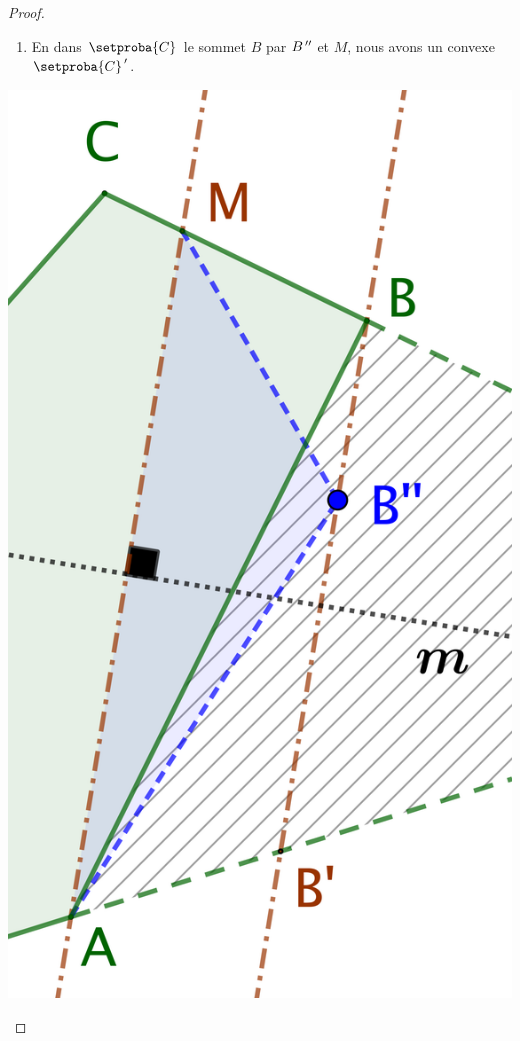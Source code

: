 \begin{proof}
\begin{itemize}
\begin{enumerate}
			\item En  dans $\setproba{C}$ le sommet $B$ par $B^{\,\prime\prime}$ et $M$,
		nous avons un  convexe $\primeit{\setproba{C}}$.
		\end{enumerate}
		\begin{center}
			\includegraphics[scale=.4]{content/polygon/at-least-one/add-vertex-1-2.png}
		\end{center}



\end{itemize}
\end{proof}
